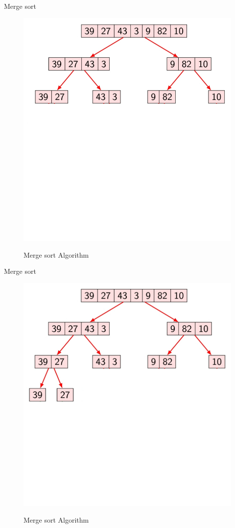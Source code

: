 \documentclass{beamer}
\begin{document}
\begin{frame}{Merge sort}
	\begin{figure}[h]
		\centering
		\includegraphics[scale=0.24]{IKEHS4.jpg}
		\label{fig:2}
		\caption{Merge sort Algorithm}
	\end{figure}
\end{frame}

\begin{frame}{Merge sort}
	\begin{figure}[h]
		\centering
		\includegraphics[scale=0.24]{IKEHS5.jpg}
		\label{fig:2}
		\caption{Merge sort Algorithm}
	\end{figure}
\end{frame}
\end{document}
